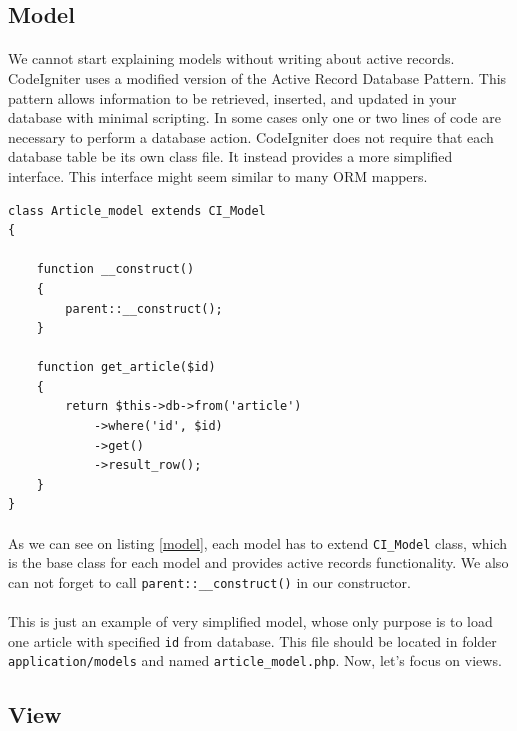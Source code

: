 \subsection{Model}
\paragraph{}
We cannot start explaining models without writing about active records. CodeIgniter uses a modified version of the Active Record Database Pattern. This pattern allows information to be retrieved, inserted, and updated in your database with minimal scripting. In some cases only one or two lines of code are necessary to perform a database action. CodeIgniter does not require that each database table be its own class file. It instead provides a more simplified interface. \cite{codeigniter} This interface might seem similar to many ORM mappers.

\begin{lstlisting}[label={model}, caption={Article model}]
class Article_model extends CI_Model
{

    function __construct()
    {
        parent::__construct();
    }

    function get_article($id)
    {
        return $this->db->from('article')
            ->where('id', $id)
            ->get()
            ->result_row();
    }
}
\end{lstlisting}


\paragraph{}
As we can see on listing \ref{model}, each model has to extend \texttt{CI\_Model} class, which is the base class for each model and provides active records functionality. We also can not forget to call \texttt{parent::\_\_construct()} in our constructor.

\paragraph{}
This is just an example of very simplified model, whose only purpose is to load one article with specified \texttt{id} from database. This file should be located in folder \texttt{application/models} and named \texttt{article\_model.php}.   Now, let's focus on views.

\subsection{View}


